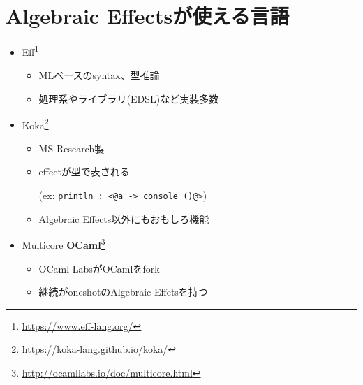 \section{Algebraic Effectsが使える言語}
\begin{frame}[fragile]
    \frametitlesec

    \begin{itemize}
        \item Eff\footnote{\url{https://www.eff-lang.org/}}

            \begin{itemize}
                \item MLベースのsyntax、型推論
                \item 処理系やライブラリ(EDSL)など実装多数
            \end{itemize}

        \item Koka\footnote{\url{https://koka-lang.github.io/koka/}}

            \begin{itemize}
                \item MS Research製
                \item effectが型で表される

                    (ex: \lstinline{println : <@a -> console ()@>})
                \item Algebraic Effects以外にもおもしろ機能
            \end{itemize}

        \item Multicore \textbf{OCaml}\footnote{\url{http://ocamllabs.io/doc/multicore.html}}

            \begin{itemize}
                \item OCaml LabsがOCamlをfork
                \item 継続が\alert{oneshot}のAlgebraic Effetsを持つ
            \end{itemize}
    \end{itemize}
\end{frame}

